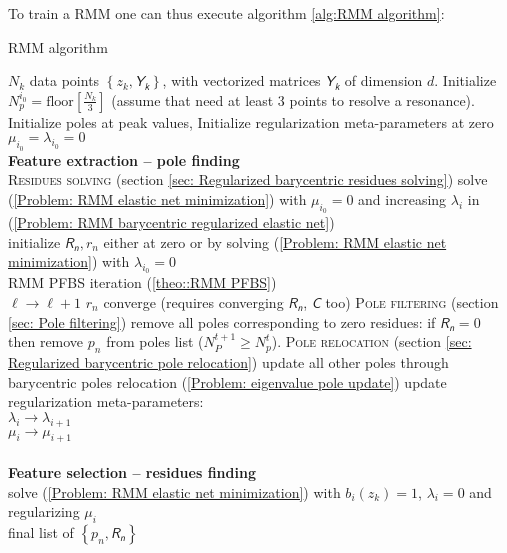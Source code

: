 \documentclass{article}
\newcommand{\mat}[1]{\bm{\mathsfit{#1}}}
\begin{document}
To train a RMM one can thus execute algorithm \ref{alg:RMM algorithm}:
\begin{algorithm}[tb]
   \caption{RMM algorithm}
   \label{alg:RMM algorithm}
\begin{algorithmic}
    $N_k$ data points $\left\{z_k , \mat{Y_k}\right\}$, with vectorized matrices $\mat{Y_k}$ of dimension $d$.  
   \STATE Initialize $N_p^{i_0} = \mathrm{floor}\left[ \frac{N_k}{3} \right]$ (assume that need at least 3 points to resolve a resonance).\\
   \STATE Initialize poles at peak values,
   \STATE Initialize regularization meta-parameters at zero $\mu_{i_0}  = \lambda_{i_0} = 0$\\
   \STATE \textbf{Feature extraction -- pole finding}\\
   \REPEAT
   \STATE \textsc{Residues solving} (section \ref{sec: Regularized barycentric residues solving})
   \STATE solve (\ref{Problem: RMM elastic net minimization}) with $\mu_{i_0} = 0$ and increasing $\lambda_i$ in (\ref{Problem: RMM barycentric regularized elastic net})\\
   \STATE initialize $\mat{R_n}, r_n$ either at zero or by solving (\ref{Problem: RMM elastic net minimization}) with $\lambda_{i_0} = 0$ \\
   \REPEAT
        \STATE RMM PFBS iteration (\ref{theo::RMM PFBS}) \\
        \STATE $\ell \to \ell + 1$
   \UNTIL $r_n$ converge (requires converging $\mat{R_n}$, $\mat{C}$ too)
   \STATE \textsc{Pole filtering} (section \ref{sec: Pole filtering})
   \STATE remove all poles corresponding to zero residues: if $\mat{R_n} = \mat{0}$ then remove $p_n$ from poles list ($N_P^{t+1} \geq N_p^{t} $).
   \STATE \textsc{Pole relocation} (section \ref{sec: Regularized barycentric pole relocation}) 
   \STATE update all other poles through barycentric poles relocation (\ref{Problem: eigenvalue pole update})
   \STATE update regularization meta-parameters: \\
   $\lambda_{i} \to  \lambda_{i+1}$\\
   $\mu_i \to \mu_{i+1}$\\
   \\
   \STATE \textbf{Feature selection -- residues finding}\\
   \STATE solve (\ref{Problem: RMM elastic net minimization}) with $b_{i}(z_k) = 1 $, $\lambda_{i} = 0 $ and regularizing $\mu_i$ \\
    final list of $\left\{p_n , \mat{R_n}\right\}$
\end{algorithmic}
\end{algorithm}
\end{document}
